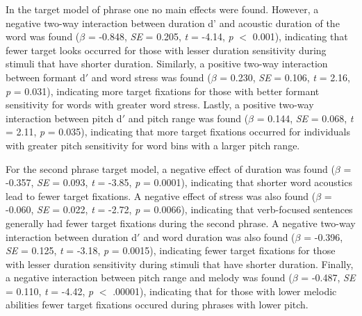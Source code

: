 In the target model of phrase one no main effects were found. However, a negative two-way interaction between duration d' and acoustic duration of the word was found ($\beta$ = -0.848, \textit{SE} = 0.205, \textit{t} = -4.14, \textit{p} $<$ 0.001), indicating that fewer target looks occurred for those with lesser duration sensitivity during stimuli that have shorter duration. Similarly, a positive two-way interaction between formant d$'$ and word stress was found ($\beta$ = 0.230, \textit{SE} = 0.106, \textit{t} = 2.16, \textit{p} = 0.031), indicating more target fixations for those with better formant sensitivity for words with greater word stress. Lastly, a positive two-way interaction between pitch d$'$ and pitch range was found ($\beta$ = 0.144, \textit{SE} = 0.068, \textit{t} = 2.11, \textit{p} = 0.035), indicating that more target fixations occurred for individuals with greater pitch sensitivity for word bins with a larger pitch range.

 For the second phrase target model, a negative effect of duration was found ($\beta$ = -0.357, \textit{SE} = 0.093, \textit{t} = -3.85, \textit{p} = 0.0001), indicating that shorter word acoustics lead to fewer target fixations. A negative effect of stress was also found ($\beta$ = -0.060, \textit{SE} = 0.022, \textit{t} = -2.72, \textit{p} = 0.0066), indicating that verb-focused sentences generally had fewer target fixations during the second phrase. A negative two-way interaction between duration d$'$ and word duration was also found ($\beta$ = -0.396, \textit{SE} = 0.125, \textit{t} = -3.18, \textit{p} = 0.0015), indicating fewer target fixations for  those with lesser duration sensitivity during stimuli that have shorter duration. Finally, a negative interaction between pitch range and melody was found ($\beta$ = -0.487, \textit{SE} = 0.110, \textit{t} = -4.42, \textit{p} $<$ .00001), indicating that for those with lower melodic abilities fewer target fixations occured during phrases with lower pitch.

